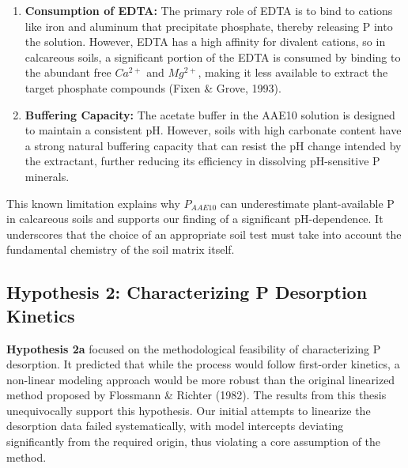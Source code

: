 \documentclass[
  a4paper,
]{article}
\providecommand{\tightlist}{%
  \setlength{\itemsep}{0pt}\setlength{\parskip}{0pt}}
\begin{document}
\begin{enumerate}
\def\labelenumi{\arabic{enumi}.}
\tightlist
\item
  \textbf{Consumption of EDTA:} The primary role of EDTA is to bind to
  cations like iron and aluminum that precipitate phosphate, thereby
  releasing P into the solution. However, EDTA has a high affinity for
  divalent cations, so in calcareous soils, a significant portion of the
  EDTA is consumed by binding to the abundant free \(Ca^{2+}\) and
  \(Mg^{2+}\), making it less available to extract the target phosphate
  compounds (Fixen \& Grove, 1993).
\item
  \textbf{Buffering Capacity:} The acetate buffer in the AAE10 solution
  is designed to maintain a consistent pH. However, soils with high
  carbonate content have a strong natural buffering capacity that can
  resist the pH change intended by the extractant, further reducing its
  efficiency in dissolving pH-sensitive P minerals.
\end{enumerate}

This known limitation explains why \(P_{AAE10}\) can underestimate
plant-available P in calcareous soils and supports our finding of a
significant pH-dependence. It underscores that the choice of an
appropriate soil test must take into account the fundamental chemistry
of the soil matrix itself.

\subsection{Hypothesis 2: Characterizing P Desorption
Kinetics}\label{hypothesis-2-characterizing-p-desorption-kinetics}

\textbf{Hypothesis 2a} focused on the methodological feasibility of
characterizing P desorption. It predicted that while the process would
follow first-order kinetics, a non-linear modeling approach would be
more robust than the original linearized method proposed by Flossmann \&
Richter (1982). The results from this thesis unequivocally support this
hypothesis. Our initial attempts to linearize the desorption data failed
systematically, with model intercepts deviating significantly from the
required origin, thus violating a core assumption of the method.
\end{document}
